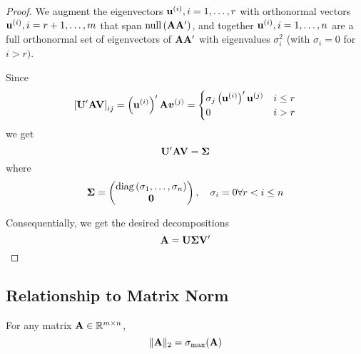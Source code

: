 \begin{proof}
	We augment the eigenvectors ${\bf u}^{(i)},i=1,\ldots,r$ with orthonormal vectors ${\bf u}^{(i)},i=r+1,\ldots,m$ that span $\operatorname{null}\left({\bf A}{\bf A}^{\prime}\right)$, and together ${\bf u}^{(i)},i=1,\ldots,n$ are a full orthonormal set of eigenvectors of ${\bf A}{\bf A}^{\prime}$ with eigenvalues $\sigma_{i}^{2}$ (with $\sigma_{i}=0$ for $i>r)$.

	Since
	\begin{equation*}
		\left[\mathbf{U}^{\prime}{\bf A}\mathbf{V}\right]_{ij}=\left({\bf u}^{(i)}\right)^{\prime}{\bf A}\boldsymbol{v}^{(j)}=\begin{cases}\sigma_{j}\left({\bf u}^{(i)}\right)^{\prime}{\bf u}^{(j)} & i \leq r \\ 0 & i>r\end{cases}
	\end{equation*}
	we get
	\begin{equation*}
		\mathbf{U}^{\prime}{\bf A}\mathbf{V}=\boldsymbol{\Sigma}
	\end{equation*}
	where
	\begin{equation*}
		\boldsymbol{\Sigma}=\begin{pmatrix}
			\operatorname{diag}\left(\sigma_{1},\ldots,\sigma_{n}\right) \\
			\mathbf{0}
		\end{pmatrix}
		,\quad\sigma_{i}=0\forall r<i\leq n
	\end{equation*}

	Consequentially, we get the desired decompositions
	\begin{equation*}
		{\bf A}=\mathbf{U}\boldsymbol{\Sigma}\mathbf{V}^{\prime}
	\end{equation*}
\end{proof}

\subsection{Relationship to Matrix Norm}

\begin{theorem}
	For any matrix ${\bf A}\in{\mathbb R}^{m\times n}$,
	\begin{equation}
		\|{\bf A}\|_{2}=\sigma_{\max}({\bf A})
	\end{equation}
\end{theorem}

